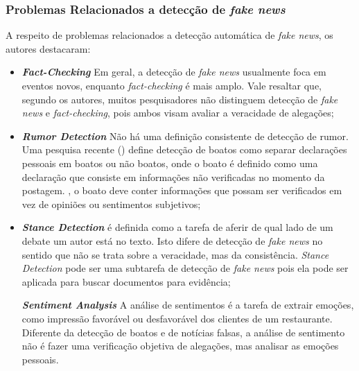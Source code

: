 \subsubsection{Problemas Relacionados a detecção de \textit{fake news}}

A respeito de problemas relacionados a detecção automática de \textit{fake news}, os autores destacaram: 

\begin{itemize}
\item \textbf{\textit{Fact-Checking}} Em geral, a detecção de \textit{fake news} usualmente foca em eventos novos, enquanto \textit{fact-checking} é mais amplo. 
Vale resaltar que, segundo os autores, muitos pesquisadores não distinguem detecção de \textit{fake news} e \textit{fact-checking}, pois ambos visam avaliar a veracidade de alegações;  

\item \textbf{\textit{Rumor Detection}} Não há uma definição consistente de detecção de rumor. Uma pesquisa recente (\cite{zubiaga2018}) define detecção de boatos como separar declarações pessoais em boatos ou não boatos, onde o boato é definido como uma declaração que consiste em informações não verificadas no momento da postagem. , o boato deve conter informações que possam ser verificados em vez de opiniões ou sentimentos subjetivos; 


\item  \textbf{\textit{Stance Detection}} é definida como a tarefa de aferir de qual lado de um debate um autor está no texto. Isto difere de detecção de \textit{fake news} no sentido que não se trata sobre a veracidade, mas da consistência. 
 \textit{Stance Detection} pode ser uma subtarefa de detecção de \textit{fake news} pois ela pode ser aplicada para buscar documentos para evidência; 


\textbf{\textit{Sentiment Analysis}} A análise de sentimentos é a tarefa de extrair emoções, como impressão favorável ou desfavorável dos clientes de um restaurante. Diferente da detecção de boatos e de notícias falsas, a análise de sentimento não é fazer uma verificação objetiva de alegações, mas  analisar as emoções pessoais. 

\end{itemize}

